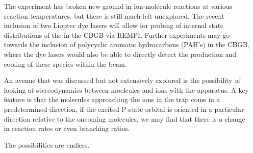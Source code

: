 The experiment has broken new ground in ion-molecule reactions at various reaction temperatures, but there is still much left unexplored. The recent inclusion of two Lioptec dye lasers will allow for probing of internal state distributions of the  in the CBGB via REMPI. Further experiments may go towards the inclusion of polycyclic aromatic hydrocarbons (PAH's) in the CBGB, where the dye lasers would also be able to directly detect the production and cooling of these species within the beam.

An avenue that was discussed but not extensively explored is the possibility of looking at stereodynamics between moelcules and ions with the apparatus. A key feature is that the molecules approaching the ions in the trap come in a predetermined direction, if the excited  P-state orbital is oriented in a particular direction relative to the oncoming molecules, we may find that there is a change in reaction rates or even branching ratios.

The possibilities are endless.